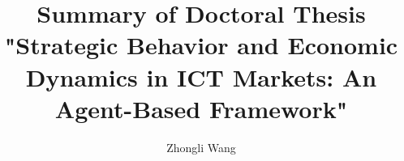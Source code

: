 \documentclass[11pt]{article}
\title{Summary of Doctoral Thesis \\ "Strategic Behavior and Economic Dynamics in ICT Markets: An Agent-Based Framework"}
\author{Zhongli Wang}
\begin{document}
% 
\maketitle

\onehalfspacing

\end{document}
